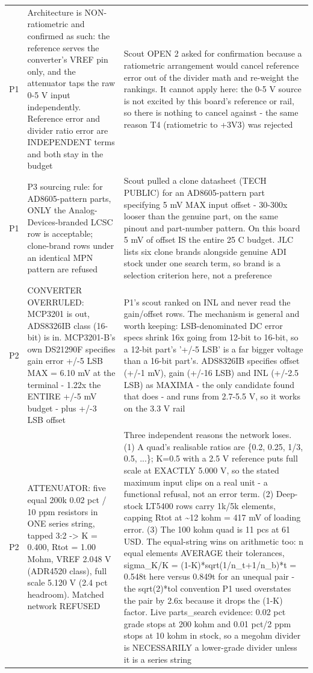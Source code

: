 \documentclass[11pt,a4paper]{article}
\begin{document}
{\begin{longtable}{lp{5.2cm}p{7.2cm}}
P1 & Architecture is NON-ratiometric and confirmed as such: the reference serves the converter's VREF pin only, and the attenuator taps the raw 0-5 V input independently. Reference error and divider ratio error are INDEPENDENT terms and both stay in the budget & Scout OPEN 2 asked for confirmation because a ratiometric arrangement would cancel reference error out of the divider math and re-weight the rankings. It cannot apply here: the 0-5 V source is not excited by this board's reference or rail, so there is nothing to cancel against - the same reason T4 (ratiometric to +3V3) was rejected \\
P1 & P3 sourcing rule: for AD8605-pattern parts, ONLY the Analog-Devices-branded LCSC row is acceptable; clone-brand rows under an identical MPN pattern are refused & Scout pulled a clone datasheet (TECH PUBLIC) for an AD8605-pattern part specifying 5 mV MAX input offset - 30-300x looser than the genuine part, on the same pinout and part-number pattern. On this board 5 mV of offset IS the entire 25 C budget. JLC lists six clone brands alongside genuine ADI stock under one search term, so brand is a selection criterion here, not a preference \\
P2 & CONVERTER OVERRULED: MCP3201 is out, ADS8326IB class (16-bit) is in. MCP3201-B's own DS21290F specifies gain error +/-5 LSB MAX = 6.10 mV at the terminal - 1.22x the ENTIRE +/-5 mV budget - plus +/-3 LSB offset & P1's scout ranked on INL and never read the gain/offset rows. The mechanism is general and worth keeping: LSB-denominated DC error specs shrink 16x going from 12-bit to 16-bit, so a 12-bit part's '+/-5 LSB' is a far bigger voltage than a 16-bit part's. ADS8326IB specifies offset (+/-1 mV), gain (+/-16 LSB) and INL (+/-2.5 LSB) as MAXIMA - the only candidate found that does - and runs from 2.7-5.5 V, so it works on the 3.3 V rail \\
P2 & ATTENUATOR: five equal 200k 0.02 pct / 10 ppm resistors in ONE series string, tapped 3:2 -\textgreater{} K = 0.400, Rtot = 1.00 Mohm, VREF 2.048 V (ADR4520 class), full scale 5.120 V (2.4 pct headroom). Matched network REFUSED & Three independent reasons the network loses. (1) A quad's realisable ratios are \{0.2, 0.25, 1/3, 0.5, ...\}; K=0.5 with a 2.5 V reference puts full scale at EXACTLY 5.000 V, so the stated maximum input clips on a real unit - a functional refusal, not an error term. (2) Deep-stock LT5400 rows carry 1k/5k elements, capping Rtot at \textasciitilde{}12 kohm = 417 mV of loading error. (3) The 100 kohm quad is 11 pcs at 61 USD. The equal-string wins on arithmetic too: n equal elements AVERAGE their tolerances, sigma\_K/K = (1-K){*}sqrt(1/n\_t+1/n\_b){*}t = 0.548t here versus 0.849t for an unequal pair - the sqrt(2){*}tol convention P1 used overstates the pair by 2.6x because it drops the (1-K) factor. Live parts\_search evidence: 0.02 pct grade stops at 200 kohm and 0.01 pct/2 ppm stops at 10 kohm in stock, so a megohm divider is NECESSARILY a lower-grade divider unless it is a series string \\

\end{longtable}}
\end{document}
